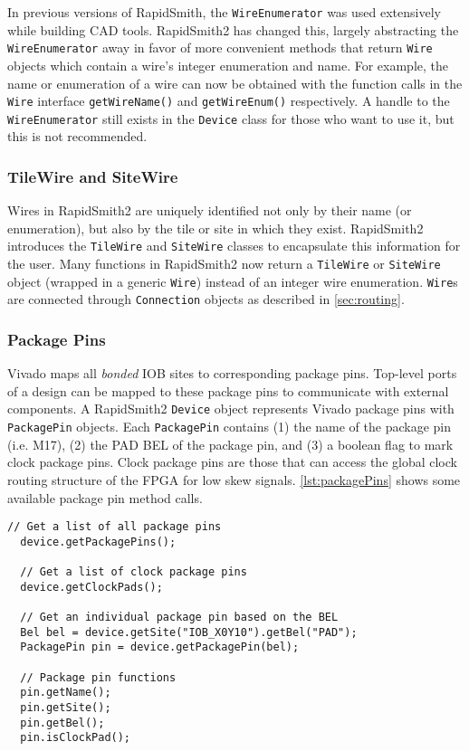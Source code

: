 In previous versions of RapidSmith, the \texttt{WireEnumerator} was used
extensively while building CAD tools. RapidSmith2 has changed this, largely
abstracting the \texttt{WireEnumerator} away in favor of more convenient
methods that return \texttt{Wire} objects which contain a wire's integer
enumeration and name. For example, the name or enumeration of a wire can now be
obtained with the function calls in the \texttt{Wire} interface
\texttt{getWireName()} and \texttt{getWireEnum()} respectively. A handle to the
\texttt{WireEnumerator} still exists in the \texttt{Device} class for those who
want to use it, but this is not recommended.


\subsubsection{TileWire and SiteWire} \label{wires}
Wires in RapidSmith2 are uniquely identified not only by their name
(or enumeration), but also by the tile or site in which they exist.
RapidSmith2 introduces the \texttt{TileWire} and \texttt{SiteWire} classes to
encapsulate this information for the user. Many functions in RapidSmith2 now
return a \texttt{TileWire} or \texttt{SiteWire} object (wrapped in a generic
\texttt{Wire}) instead of an integer wire enumeration. \texttt{Wire}s are
connected through \texttt{Connection} objects as described in
\autoref{sec:routing}.

\subsubsection{Package Pins}

Vivado maps all \textit{bonded} IOB sites to corresponding package pins.
Top-level ports of a design can be mapped to these package pins to communicate
with external components. A RapidSmith2 \texttt{Device} object represents Vivado
package pins with \texttt{PackagePin} objects. Each \texttt{PackagePin} 
contains (1) the name of the package pin (i.e. M17), (2) the PAD BEL of the
package pin, and (3) a boolean flag to mark clock package pins. Clock
package pins are those that can access the global clock routing structure of
the FPGA for low skew signals. \autoref{lst:packagePins} shows some available
package pin method calls.

\begin{lstlisting}[xleftmargin=1.5em, framexleftmargin=1.5em,caption=RapidSmith2
package pin functions, label=lst:packagePins] 
  // Get a list of all package pins 
  device.getPackagePins();
	
  // Get a list of clock package pins
  device.getClockPads();
	
  // Get an individual package pin based on the BEL
  Bel bel = device.getSite("IOB_X0Y10").getBel("PAD");
  PackagePin pin = device.getPackagePin(bel);
	
  // Package pin functions
  pin.getName();
  pin.getSite();
  pin.getBel();
  pin.isClockPad();	
\end{lstlisting}


